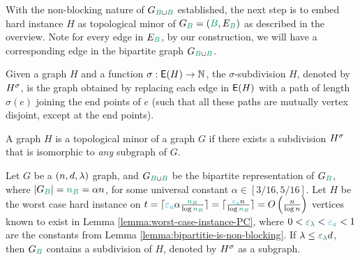 \documentclass[11pt]{article}
\begin{document}
With the non-blocking nature of $\BipartiteG$ established, the next step is to embed hard instance $H$ as topological minor of $G_{\GreenB}=(\GreenB, E_{\GreenB})$ as described in the overview.
Note for every edge in $E_{\GreenB}$, by our construction, we will have a corresponding edge in the bipartite graph $\BipartiteG$.


\begin{definition}\label{def:subdivisions}
Given a graph $H$ and a function $\sigma: \mathsf{E}(H) \rightarrow \mathbb{N}$, the $\sigma$-subdivision $H$, denoted by ${H}^{\sigma}$, is the graph obtained by replacing each edge in $\mathsf{E}(H)$ with a path of length $\sigma(e)$ joining the end points of $e$ (such that all these paths are mutually vertex disjoint, except at the end points).	
\end{definition}

\begin{definition}\label{def:topological-minor}
A graph $H$ is a topological minor of a graph $G$ if there exists a subdivision ${H}^{\sigma}$ that is isomorphic to \emph{any} subgraph of $G$.	
\end{definition}

\begin{theorem}\label{thm:top-embedding}
Let $G$ be a $(n, d, \lambda)$ graph, and $\BipartiteG$ be the bipartite representation of $G_{\GreenB}$, where $|G_{\GreenB}| = \na = \alpha n$, for some universal constant $\alpha \in [3/16, 5/16]$.
Let $H$ be the worst case hard instance on $t = \lceil\epsilonA\alpha \frac{\na}{\log \na}\rceil = \lceil \frac{\epsilonA n}{\log \na}\rceil = \BigO{\frac{n}{\log n}}$ vertices known to exist in Lemma \ref{lemma:worst-case-instance-PC}, where $0 < \epsilonL < \epsilonA <1$ are the constants from  Lemma \ref{lemma:bipartitie-is-non-blocking}.	
If $\lambda \leq \epsilonL d$, then $G_{\GreenB}$ contains a subdivision of $H$, denoted by ${H}^{\sigma}$ as a subgraph.

\end{theorem}
\end{document}
